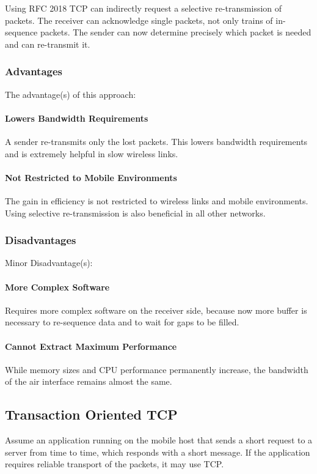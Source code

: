 Using RFC 2018 TCP can indirectly request a selective re-transmission of packets. The receiver can acknowledge single packets, not only trains of in-sequence packets. The sender can now determine precisely which packet is needed and can re-transmit it.

\subsubsection{Advantages}
The advantage(s) of this approach: 

\paragraph*{Lowers Bandwidth Requirements}
A sender re-transmits only the lost packets. This lowers bandwidth requirements and is extremely helpful in slow wireless links. 

\paragraph*{Not Restricted to Mobile Environments}
The gain in efficiency is not restricted to wireless links and mobile environments. Using selective re-transmission is also beneficial in all other networks. 

\subsubsection{Disadvantages}
Minor Disadvantage(s):

\paragraph*{More Complex Software}
Requires more complex software on the receiver side, because now more buffer is necessary to re-sequence data and to wait for gaps to be filled. 

\paragraph*{Cannot Extract Maximum Performance}
While memory sizes and CPU performance permanently increase, the bandwidth of the air interface remains almost the same.
 

\subsection{Transaction Oriented TCP}
Assume an application running on the mobile host that sends a short request to a server from time to time, which responds with a short message. If the application requires reliable transport of the packets, it may use TCP.\par

